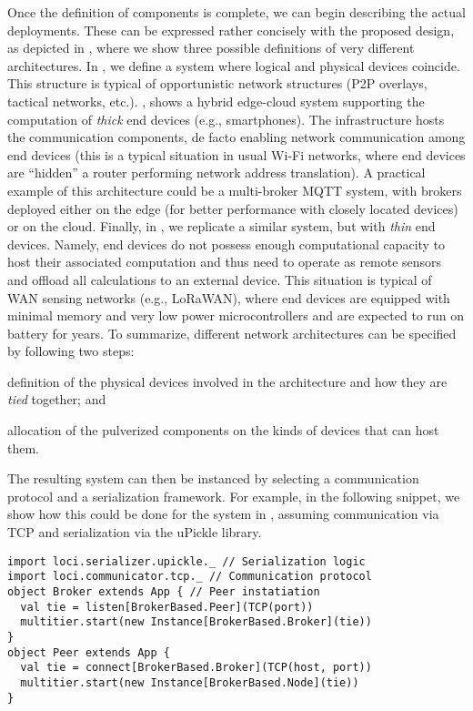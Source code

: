 Once the definition of components is complete, we can begin describing the actual deployments.
%
These can be expressed rather concisely with the proposed design, as depicted in ,
where we show three possible definitions of very different architectures.
%
In , we define a system where logical and physical devices coincide.
%
This structure is typical of opportunistic network structures (P2P overlays, tactical networks, etc.).
%
, shows a hybrid edge-cloud system supporting the computation of \emph{thick} end devices (e.g., smartphones).
%
The infrastructure hosts the communication components,
de facto enabling network communication among end devices
(this is a typical situation in usual Wi-Fi networks, where end devices are ``hidden'' a router performing network address translation).
%
A practical example of this architecture could be a multi-broker MQTT system,
with brokers deployed either on the edge
(for better performance with closely located devices)
or on the cloud.
%
Finally, in , we replicate a similar system, but with \emph{thin} end devices.
%
Namely, end devices do not possess enough computational capacity to host their associated computation
and thus need to operate as remote sensors and offload all calculations to an external device.
%
This situation is typical of WAN sensing networks (e.g., LoRaWAN),
where end devices are equipped with minimal memory and very low power microcontrollers
and are expected to run on battery for years.
%
To summarize, different network architectures can be specified by following two steps:
\begin{enumerate*}
 \item definition of the physical devices involved in the architecture and how they are \emph{tied} together; and
 \item allocation of the pulverized components on the kinds of devices that can host them.
\end{enumerate*}

The resulting system can then be instanced by selecting a communication protocol and a serialization framework.
%
For example, in the following snippet, we show how this could be done for the system in , assuming communication via TCP and serialization via the uPickle library.

\begin{verbatim}
import loci.serializer.upickle._ // Serialization logic
import loci.communicator.tcp._ // Communication protocol
object Broker extends App { // Peer instatiation
  val tie = listen[BrokerBased.Peer](TCP(port))
  multitier.start(new Instance[BrokerBased.Broker](tie))
}
object Peer extends App {
  val tie = connect[BrokerBased.Broker](TCP(host, port))
  multitier.start(new Instance[BrokerBased.Node](tie))
}
\end{verbatim}

